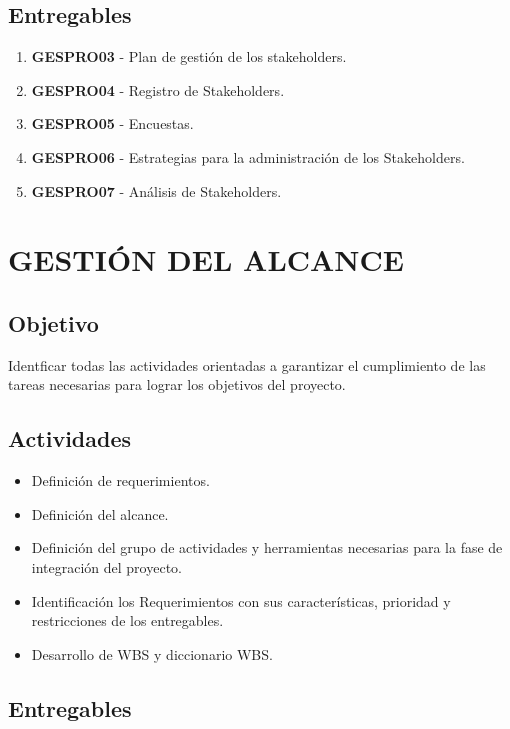 \section{Entregables}

\begin{enumerate}
	\item \textbf{GESPRO03} - Plan de gesti\'on de los stakeholders.
	\item \textbf{GESPRO04} - Registro de Stakeholders.
	\item \textbf{GESPRO05} - Encuestas.
	\item \textbf{GESPRO06} - Estrategias para la administraci\'on de los Stakeholders.
	\item \textbf{GESPRO07} - An\'alisis de Stakeholders.
\end{enumerate}

\chapter{GESTI\'ON DEL ALCANCE}

\section{Objetivo}
Identficar todas las actividades orientadas a garantizar el cumplimiento de las tareas necesarias para
lograr los objetivos del proyecto.
%
\section{Actividades}
%
\begin{itemize}
	\item Definici\'on de requerimientos.
	
	\item Definici\'on del 	alcance.
	
	\item Definici\'on del grupo de actividades y herramientas necesarias para la fase de integraci\'on del 
		proyecto.
	
	\item Identificaci\'on los Requerimientos con sus caracter\'isticas, prioridad y restricciones de los 	
		entregables.
		
	\item Desarrollo de WBS y diccionario WBS.
\end{itemize}

%
\section{Entregables}

